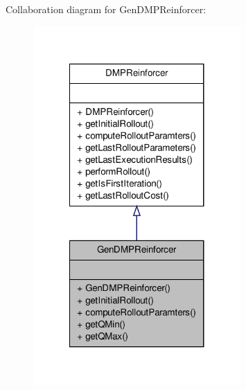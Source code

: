 \-Collaboration diagram for \-Gen\-D\-M\-P\-Reinforcer\-:
\nopagebreak
\begin{figure}[H]
\begin{center}
\leavevmode
\includegraphics[width=224pt]{classGenDMPReinforcer__coll__graph}
\end{center}
\end{figure}
